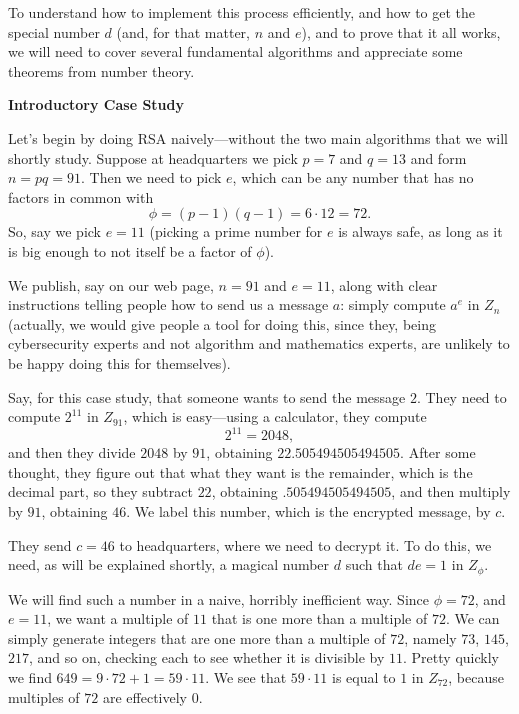 To understand how to implement this process efficiently, and how to get the special
number $d$ (and, for that matter, $n$ and $e$), and to prove that it all works, we will
need to cover several fundamental algorithms and appreciate some
theorems from number theory.
\border

{\bf Introductory Case Study}
\medskip

Let's begin by doing RSA naively---without the two main algorithms that we will shortly study.
Suppose at headquarters we pick $p=7$ and $q=13$ and form $n = pq = 91$.
Then we need to pick $e$, which can be any number that has no factors in common with
$$
\phi = (p-1)(q-1) = 6\cdot 12 = 72.
$$
So, say we pick $e=11$ (picking a prime number for $e$ is always
safe, as long as it is big enough to
not itself be a factor of $\phi$).
\medskip

We publish, say on our web page, $n=91$ and $e=11$, along with clear instructions telling
people how to send us a message $a$:  simply compute $a^e$ in $Z_n$ (actually, we would
give people a tool for doing this, since they, being cybersecurity experts and not algorithm and
mathematics experts, are unlikely to be happy doing this for themselves).
\medskip

Say, for this case study, that someone wants to send the message $2$.
They need to compute $2^{11}$ in $Z_{91}$, which is easy---using a calculator, they
compute
$$
2^{11} = 2048,
$$
and then they divide $2048$ by $91$, obtaining $22.505494505494505$.
After some thought, they figure out that what they want is the remainder, which is the
decimal part, so they subtract $22$, obtaining $.505494505494505$, and then multiply by
$91$, obtaining $46$.  We label this number, which is the encrypted message, by $c$.
\medskip

They send $c=46$ to headquarters, where we need to decrypt it.  To do this, we need, as will
be explained shortly, a magical number $d$ such that $de = 1$ in $Z_\phi$.
\medskip

We will find such a number in a naive, horribly inefficient way.  Since
$\phi = 72$, and $e=11$, we want a multiple of $11$ that is one more than a multiple of $72$.
We can simply generate integers that are one more than a multiple of $72$, namely 
$73$, $145$, $217$, and so on, checking each to see whether it is divisible by $11$.
Pretty quickly we find $649 = 9 \cdot 72 + 1 = 59 \cdot 11$.
We see that $59 \cdot 11 $ is equal to $1$ in $Z_{72}$, because multiples of $72$ are effectively $0$.
\medskip

